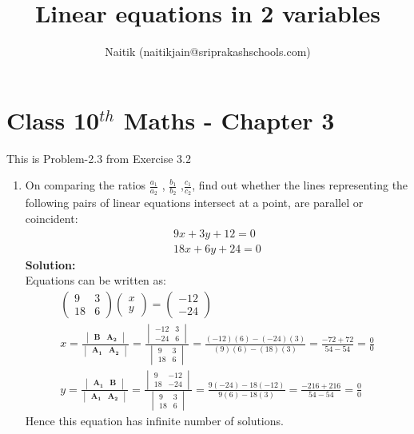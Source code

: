 \documentclass[10pt]{article}
\title{Linear equations in 2 variables}
\author{Naitik (naitikjain@sriprakashschools.com)}
\newcommand{\myvec}[1]{\ensuremath{\begin{pmatrix}#1\end{pmatrix}}}
\newcommand{\mydet}[1]{\ensuremath{\begin{vmatrix}#1\end{vmatrix}}}
\newcommand{\solution}{\noindent \textbf{Solution: }}
\let\vec\mathbf
\begin{document}
\maketitle
\section*{Class 10$^{th}$ Maths - Chapter 3}
This is Problem-2.3 from Exercise 3.2
\begin{enumerate}
\item On comparing the ratios $\frac{a_1}{a_2}$ , $\frac{b_1}{b_2}$ ,$\frac{c_1}{c_2}$, find out whether the lines representing the following pairs of linear equations intersect at a point, are parallel or coincident:\\
\begin{align}
9x+3y+12=0\\
18x+6y+24=0
\end{align}
\solution \\
Equations can be written as:\\
\begin{align}
\myvec{9&3\\18&6} \myvec{x\\y}= \myvec{-12\\-24}\\
 x= \frac{{\mydet{\vec{B} & \vec{A_2}}}}{\mydet{\vec{A_1} &\vec{ A_2}}}
=\frac{\mydet{-12&3\\-24&6}}{\mydet{9&3\\18&6}}
=\frac{{(-12)(6) - (-24)(3)}}{{(9)(6) - (18)(3)}}
=\frac{-72+72}{54-54}
=\frac{0}{0}\\ 
 y= \frac{{\mydet{\vec{A_1} &\vec{B}}}}{\mydet{\vec{A_1} &\vec{ A_2}}}
=\frac{\mydet{9&-12\\18&-24}}{\mydet{9&3\\18&6}}
=\frac{9(-24) - 18(-12)}{9(6) -18 (3)}
=\frac{-216+216}{54-54}
=\frac{0}{0}
\end{align}
Hence this equation has infinite number of solutions.
\end{enumerate}
\end{document}
